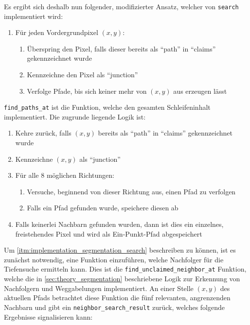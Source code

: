Es ergibt sich deshalb nun folgender, modifizierter Ansatz, welcher von \texttt{search} implementiert wird:
\begin{enumerate}
    \item Für jeden Vordergrundpixel \((x,y)\):
    \begin{enumerate}[topsep=0pt]
        \item Überspring den Pixel, falls dieser bereits als \enquote{path} in \enquote{claims} gekennzeichnet wurde
        \item Kennzeichne den Pixel als \enquote{junction}
        \item Verfolge Pfade, bis sich keiner mehr von \((x,y)\) aus erzeugen lässt
    \end{enumerate}
\end{enumerate}

\texttt{find\_paths\_at} ist die Funktion, welche den gesamten Schleifeninhalt implementiert.
Die zugrunde liegende Logik ist:
\begin{enumerate}
    \item Kehre zurück, falls \((x,y)\) bereits als \enquote{path} in \enquote{claims} gekennzeichnet wurde
    \item Kennzeichne \((x,y)\) als \enquote{junction}
    \item Für alle 8 möglichen Richtungen:
    \begin{enumerate}[topsep=0pt]
        \item\label{itm:implementation_segmentation_search} Versuche, beginnend von dieser Richtung aus, einen Pfad zu verfolgen
        \item Falls ein Pfad gefunden wurde, speichere diesen ab
    \end{enumerate}
    \item Falls keinerlei Nachbarn gefunden wurden, dann ist dies ein einzelnes, freistehendes Pixel und wird als Ein-Punkt-Pfad abgespeichert
\end{enumerate}

Um \autoref{itm:implementation_segmentation_search} beschreiben zu können, ist es zunächst notwendig, eine Funktion einzuführen, welche Nachfolger für die Tiefensuche ermitteln kann.
Dies ist die \texttt{find\_unclaimed\_neighbor\_at} Funktion, welche die in \autoref{sec:theory_segmentation} beschriebene Logik zur Erkennung von Nachfolgern und Weggabelungen implementiert.
An einer Stelle \((x,y)\) des aktuellen Pfads betrachtet diese Funktion die fünf relevanten, angrenzenden Nachbarn und gibt ein \texttt{neighbor\_search\_result} zurück, welches folgende Ergebnisse signalisieren kann:


